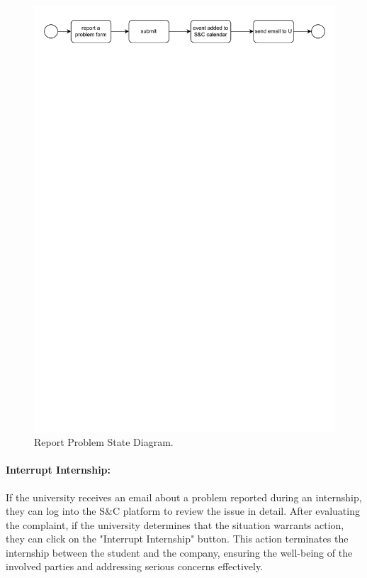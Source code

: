 \begin{figure}[H]
    \begin{center}
        \includegraphics[width=\linewidth]{Images/StateDiagram/ReportProbelm.pdf}
        \caption{Report Problem State Diagram.}
        \label{fig:report_problem_state_diag}%
    \end{center}
\end{figure}

\paragraph{Interrupt Internship:} If the university receives an email
  about a problem reported during an internship, they can log into the
  S\&C platform to review the issue in detail. After evaluating the
  complaint, if the university determines that the situation warrants
  action, they can click on the "Interrupt Internship" button.
  This action terminates the internship between the student and the
  company, ensuring the well-being of the involved parties and addressing
  serious concerns effectively.

